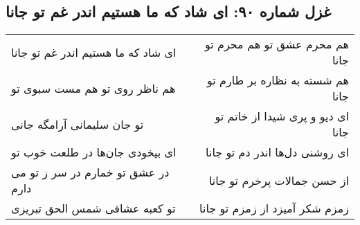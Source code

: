 \begin{center}
\section*{غزل شماره ۹۰: ای شاد که ما هستیم اندر غم تو جانا}
\label{sec:0090}
\begin{longtable}{l p{0.5cm} r}
ای شاد که ما هستیم اندر غم تو جانا
&&
هم محرم عشق تو هم محرم تو جانا
\\
هم ناظر روی تو هم مست سبوی تو
&&
هم شسته به نظاره بر طارم تو جانا
\\
تو جان سلیمانی آرامگه جانی
&&
ای دیو و پری شیدا از خاتم تو جانا
\\
ای بیخودی جان‌ها در طلعت خوب تو
&&
ای روشنی دل‌ها اندر دم تو جانا
\\
در عشق تو خمارم در سر ز تو می دارم
&&
از حسن جمالات پرخرم تو جانا
\\
تو کعبه عشاقی شمس الحق تبریزی
&&
زمزم شکر آمیزد از زمزم تو جانا
\\
\end{longtable}
\end{center}
